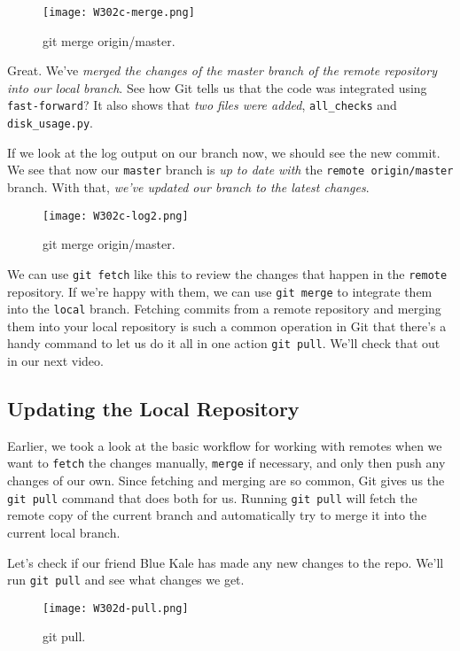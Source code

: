 \begin{figure} 
	\caption{git merge origin/master.}
	\centering
	\texttt{[image: W302c-merge.png]}
	\label{W302c-merge}
\end{figure}

Great. We've \textit{merged the changes of the master branch of the remote repository into our local branch}. See how Git tells us that the code was integrated using \verb|fast-forward|? It also shows that \textit{two files were added}, 
\verb|all_checks| and \verb|disk_usage.py|. 

If we look at the log output on our branch now, we should see the new commit. We see that now our \verb|master| branch is \textit{up to date with} the \verb|remote origin/master| branch. With that, \textit{we've updated our branch to the latest changes}.

\begin{figure} 
	\caption{git merge origin/master.}
	\centering
	\texttt{[image: W302c-log2.png]}
	\label{W302c-log2}
\end{figure}

We can use \verb|git fetch| like this to review the changes that happen in the \verb|remote| repository. If we're happy with them, we can use \verb|git merge| to integrate them into the \verb|local| branch. Fetching commits from a remote repository and merging them into your local repository is such a common operation in Git that there's a handy command to let us do it all in one action \verb|git pull|. We'll check that out in our next video.

\subsection{Updating the Local Repository} \label{W302d}

Earlier, we took a look at the basic workflow for working with remotes when we want to \verb|fetch| the changes manually, \verb|merge| if necessary, and only then push any changes of our own. Since fetching and merging are so common, Git gives us the \verb|git pull| command that does both for us. Running \verb|git pull| will fetch the remote copy of the current branch and automatically try to merge it into the current local branch.

Let's check if our friend Blue Kale has made any new changes to the repo. We'll run \verb|git pull| and see what changes we get.

\begin{figure} 
	\caption{git pull.}
	\centering
	\texttt{[image: W302d-pull.png]}
	\label{W302d-pull}
\end{figure}


